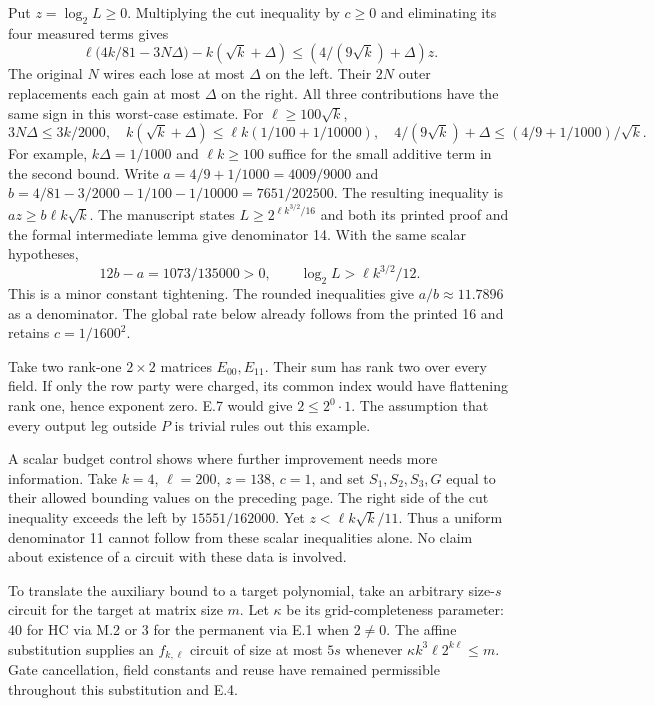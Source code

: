 \clearpage
{}
Put $z=\log_2L\ge0$. Multiplying the cut inequality by $c\ge0$ and eliminating its four measured terms gives
\[
 \ell\big(4k/81-3N\Delta\big)-k(\sqrt{k}+\Delta)
             \le (4/(9\sqrt{k})+\Delta)z .
\]
The original $N$ wires each lose at most $\Delta$ on the left. Their $2N$ outer replacements each gain at most $\Delta$ on the right. All three contributions have the same sign in this worst-case estimate. For $\ell\ge100\sqrt k$,
\[
 3N\Delta\le 3k/2000,\quad
 k(\sqrt k+\Delta)\le\ell k(1/100+1/10000),\quad
 4/(9\sqrt{k})+\Delta\le(4/9+1/1000)/\sqrt{k}.
\]
For example, $k\Delta=1/1000$ and $\ell k\ge100$ suffice for the small additive term in the second bound. Write $a=4/9+1/1000=4009/9000$ and $b=4/81-3/2000-1/100-1/10000=7651/202500$. The resulting inequality is $az\ge b\ell k\sqrt{k}$. The manuscript states $L\ge2^{\ell k^{3/2}/16}$ and both its printed proof and the formal intermediate lemma give denominator 14. With the same scalar hypotheses,
\[
 12b-a=1073/135000>0,\qquad
 \log_2 L>\ell k^{3/2}/12 .
\]
This is a minor constant tightening. The rounded inequalities give $a/b\approx11.7896$ as a denominator. The global rate below already follows from the printed 16 and retains $c=1/1600^2$.

Take two rank-one $2\times2$ matrices $E_{00},E_{11}$. Their sum has rank two over every field. If only the row party were charged, its common index would have flattening rank one, hence exponent zero. E.7 would give $2\le2^0\cdot1$. The assumption that every output leg outside $P$ is trivial rules out this example.

A scalar budget control shows where further improvement needs more information. Take $k=4$, $\ell=200$, $z=138$, $c=1$, and set $S_1,S_2,S_3,G$ equal to their allowed bounding values on the preceding page. The right side of the cut inequality exceeds the left by $15551/162000$. Yet $z<\ell k\sqrt{k}/11$. Thus a uniform denominator 11 cannot follow from these scalar inequalities alone. No claim about existence of a circuit with these data is involved.

\clearpage
{}
To translate the auxiliary bound to a target polynomial, take an arbitrary size-$s$ circuit for the target at matrix size $m$. Let $\kappa$ be its grid-completeness parameter: $40$ for HC via M.2 or $3$ for the permanent via E.1 when $2\ne0$. The affine substitution supplies an $f_{k,\ell}$ circuit of size at most $5s$ whenever $\kappa k^3\ell 2^{k\ell}\le m$. Gate cancellation, field constants and reuse have remained permissible throughout this substitution and E.4.

